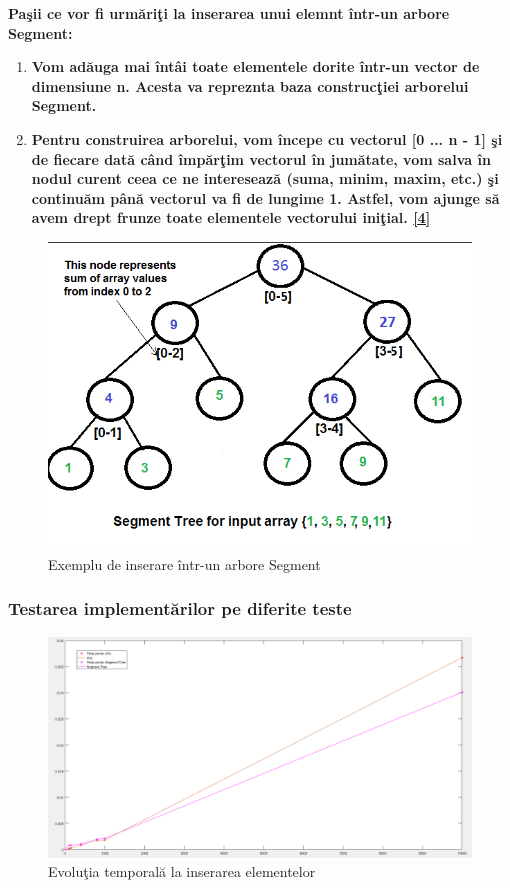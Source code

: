 \documentclass[12pt]{article}
\begin{document}
\textbf{\hspace{2mm} Pa\c{s}ii ce vor fi urm\u{a}ri\c{t}i la inserarea unui elemnt \^{i}ntr-un arbore Segment:}
\begin{enumerate}
\item{\textbf{Vom ad\u{a}uga mai \^{i}nt\^{a}i toate elementele dorite \^{i}ntr-un vector de dimensiune n. Acesta va repreznta baza construc\c{t}iei arborelui Segment.}}
\item{\textbf{Pentru construirea arborelui, vom \^{i}ncepe cu vectorul [0 ... n - 1] \c{s}i de fiecare dat\u{a} c\^{a}nd \^{i}mp\u{a}r\c{t}im vectorul \^{i}n jum\u{a}tate, vom salva \^{i}n nodul curent ceea ce ne intereseaz\u{a} (suma, minim, maxim, etc.)  \c{s}i continu\u{a}m p\^{a}n\u{a} vectorul va fi de lungime 1. Astfel, vom ajunge s\u{a} avem drept frunze toate elementele vectorului ini\c{t}ial. \hyperlink{page.14}{[4]} }}

\end{enumerate}

\begin{figure}[H]
\centering
\includegraphics[scale = 0.4]{Rotatii.png}
\caption{Exemplu de inserare \^{i}ntr-un arbore Segment}
\end{figure}

\subsubsection{Testarea implement\u{a}rilor pe diferite teste}

\begin{figure}[H]
\includegraphics[scale = 0.37]{Insert.png}
\caption{Evolu\c{t}ia temporal\u{a} la inserarea elementelor}
\end{figure}
\end{document}
